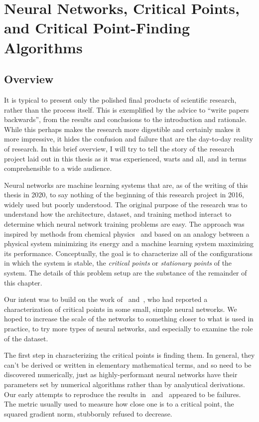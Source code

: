 \documentclass[../../thesis.tex]{subfiles}
\begin{document}
\chapter{Neural Networks, Critical Points, and Critical Point-Finding Algorithms}

\section{Overview}

It is typical to present only the polished final
products of scientific research,
rather than the process itself.
This is exemplified by the advice to
\enquote{write papers backwards},
from the results and conclusions to the introduction and rationale.
While this perhaps makes the research more digestible and
certainly makes it more impressive,
it hides the confusion and failure
that are the day-to-day reality of research.
In this brief overview,
I will try to tell the story of the research project
laid out in this thesis as it was experienced,
warts and all,
and in terms comprehensible to a wide audience.

Neural networks are machine learning systems
that are, as of the writing of this thesis in 2020,
to say nothing of the beginning of this research project in 2016,
widely used but poorly understood.
The original purpose of the research was to
understand how the
architecture, dataset, and training method
interact to determine which neural network training problems
are easy.
The approach was inspired by methods from chemical physics~\cite{ballard2017}
and based on an analogy between a physical system minimizing its energy
and a machine learning system maximizing its performance.
Conceptually, the goal is to characterize all of the configurations
in which the system is stable,
the \emph{critical points} or \emph{stationary points}
of the system.
The details of this problem setup are the substance
of the remainder of this chapter.

Our intent was to build on the work
of~\cite{dauphin2014} and~\cite{pennington2017},
who had reported a characterization of critical points in
some small, simple neural networks.
We hoped to increase the scale of the networks to something
closer to what is used in practice,
to try more types of neural networks,
and especially to examine the role of the dataset.

The first step in characterizing the critical points is finding them.
In general, they can't be derived or written in elementary mathematical terms,
and so need to be discovered numerically,
just as highly-performant neural networks have their parameters set
by numerical algorithms rather than by analyutical derivations.
Our early attempts to reproduce the results
in~\cite{dauphin2014} and~\cite{pennington2017}
appeared to be failures.
The metric usually used to measure how close one is
to a critical point, the squared gradient norm,
stubbornly refused to decrease.
\end{document}
